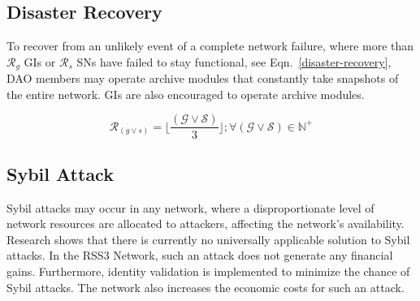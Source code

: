 \subsection{Disaster Recovery}

To recover from an unlikely event of a complete network failure, where more than $\mathcal{R}_g$ GIs or $\mathcal{R}_{s}$ SNs have failed to stay functional, see Eqn.~\ref{disaster-recovery}, DAO members may operate archive modules that constantly take snapshots of the entire network. GIs are also encouraged to operate archive modules.

\begin{equation}
\mathcal{R}_{(g \lor s)} = \lfloor\frac{\mathcal{(G \lor S)}}{3}\rfloor; \forall \mathcal{(G \lor S)} \in \mathbb{N}^+
\label{disaster-recovery}
\end{equation}

\subsection{Sybil Attack}
Sybil attacks may occur in any network, where a disproportionate level of network resources are allocated to attackers, affecting the network's availability. Research shows that there is currently no universally applicable solution to Sybil attacks\cite{douceur2002Sybil}. In the RSS3 Network, such an attack does not generate any financial gains. Furthermore, identity validation is implemented to minimize the chance of Sybil attacks. The network also increases the economic costs for such an attack.
